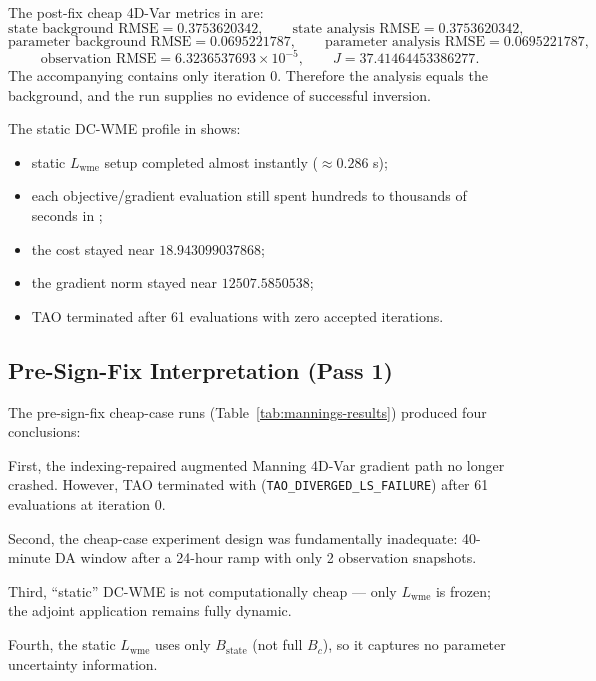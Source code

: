 \documentclass[11pt]{article}
\begin{document}
The post-fix cheap 4D-Var metrics in  are:
\[
\text{state background RMSE} = 0.3753620342,\qquad
\text{state analysis RMSE} = 0.3753620342,
\]
\[
\text{parameter background RMSE} = 0.0695221787,\qquad
\text{parameter analysis RMSE} = 0.0695221787,
\]
\[
\text{observation RMSE} = 6.3236537693\times 10^{-5},
\qquad
J = 37.41464453386277.
\]
The accompanying  contains only iteration $0$. Therefore the analysis equals the background, and the run supplies no evidence of successful inversion.

The static DC-WME profile in  shows:
\begin{itemize}
\item static $L_{\mathrm{wme}}$ setup completed almost instantly (\(\approx 0.286\) s);
\item each objective/gradient evaluation still spent hundreds to thousands of seconds in ;
\item the cost stayed near \(18.943099037868\);
\item the gradient norm stayed near \(12507.5850538\);
\item TAO terminated after 61 evaluations with zero accepted iterations.
\end{itemize}

\subsection{Pre-Sign-Fix Interpretation (Pass 1)}
The pre-sign-fix cheap-case runs (Table~\ref{tab:mannings-results}) produced four conclusions:

First, the indexing-repaired augmented Manning 4D-Var gradient path no longer crashed. However, TAO terminated with  (\texttt{TAO\_DIVERGED\_LS\_FAILURE}) after 61 evaluations at iteration 0.

Second, the cheap-case experiment design was fundamentally inadequate: 40-minute DA window after a 24-hour ramp with only 2 observation snapshots.

Third, ``static'' DC-WME is not computationally cheap --- only $L_{\mathrm{wme}}$ is frozen; the adjoint application remains fully dynamic.

Fourth, the static $L_{\mathrm{wme}}$ uses only $B_{\mathrm{state}}$ (not full $B_c$), so it captures no parameter uncertainty information.
\end{document}

